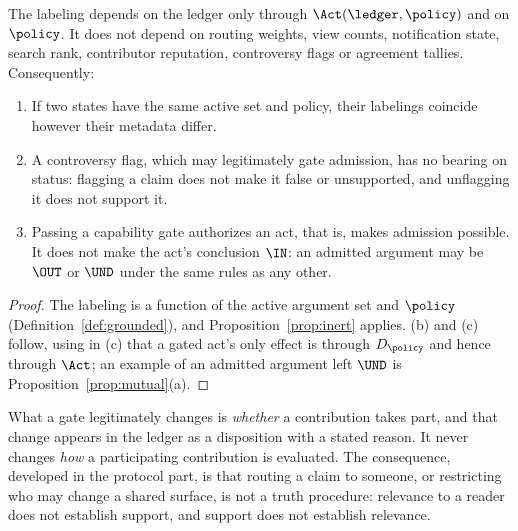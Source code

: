 \begin{proposition}\label{prop:separation}
The labeling depends on the ledger only through $\Act(\ledger,\policy)$ and on $\policy$. It does not depend on routing weights, view counts, notification state, search rank, contributor reputation, controversy flags or agreement tallies. Consequently:
\begin{enumerate}[label=(\alph*)]
\item If two states have the same active set and policy, their labelings coincide however their metadata differ.
\item A controversy flag, which may legitimately gate admission, has no bearing on status: flagging a claim does not make it false or unsupported, and unflagging it does not support it.
\item Passing a capability gate authorizes an act, that is, makes admission possible. It does not make the act's conclusion $\IN$: an admitted argument may be $\OUT$ or $\UND$ under the same rules as any other.
\end{enumerate}
\end{proposition}

\begin{proof}
The labeling is a function of the active argument set and $\policy$ (Definition~\ref{def:grounded}), and Proposition~\ref{prop:inert} applies. (b) and (c) follow, using in (c) that a gated act's only effect is through $D_\policy$ and hence through $\Act$; an example of an admitted argument left $\UND$ is Proposition~\ref{prop:mutual}(a).
\end{proof}

What a gate legitimately changes is \emph{whether} a contribution takes part, and that change appears in the ledger as a disposition with a stated reason. It never changes \emph{how} a participating contribution is evaluated. The consequence, developed in the protocol part, is that routing a claim to someone, or restricting who may change a shared surface, is not a truth procedure: relevance to a reader does not establish support, and support does not establish relevance.
